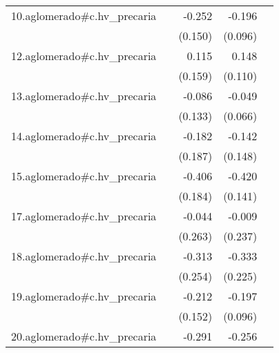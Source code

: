 {\begin{longtable}{l*{4}{D{.}{.}{-1}}}
\addlinespace
10.aglomerado#c.hv\_precaria&                     &      -0.252         &      -0.196\sym{*}  &                     \\
            &                     &     (0.150)         &     (0.096)         &                     \\
\addlinespace
12.aglomerado#c.hv\_precaria&                     &       0.115         &       0.148         &                     \\
            &                     &     (0.159)         &     (0.110)         &                     \\
\addlinespace
13.aglomerado#c.hv\_precaria&                     &      -0.086         &      -0.049         &                     \\
            &                     &     (0.133)         &     (0.066)         &                     \\
\addlinespace
14.aglomerado#c.hv\_precaria&                     &      -0.182         &      -0.142         &                     \\
            &                     &     (0.187)         &     (0.148)         &                     \\
\addlinespace
15.aglomerado#c.hv\_precaria&                     &      -0.406\sym{*}  &      -0.420\sym{**} &                     \\
            &                     &     (0.184)         &     (0.141)         &                     \\
\addlinespace
17.aglomerado#c.hv\_precaria&                     &      -0.044         &      -0.009         &                     \\
            &                     &     (0.263)         &     (0.237)         &                     \\
\addlinespace
18.aglomerado#c.hv\_precaria&                     &      -0.313         &      -0.333         &                     \\
            &                     &     (0.254)         &     (0.225)         &                     \\
\addlinespace
19.aglomerado#c.hv\_precaria&                     &      -0.212         &      -0.197\sym{*}  &                     \\
            &                     &     (0.152)         &     (0.096)         &                     \\
\addlinespace
20.aglomerado#c.hv\_precaria&                     &      -0.291         &      -0.256         &                     \\

\end{longtable}}
